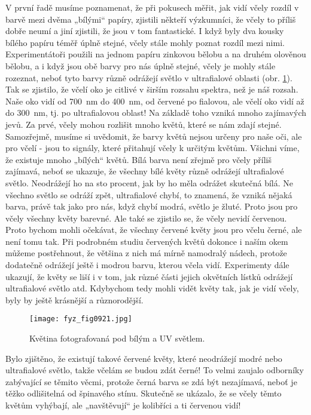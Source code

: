     V první řadě musíme poznamenat, že při pokusech měřit, jak vidí včely rozdíl v barvě mezi dvěma
    „bílými“ papíry, zjistili někteří výzkumníci, že včely to příliš dobře neumí a jiní zjistili, že
    jsou v tom fantastické. I když byly dva kousky bílého papíru téměř úplně stejné, včely stále
    mohly poznat rozdíl mezi nimi. Experimentátoři použili na jednom papíru zinkovou bělobu a na
    druhém olověnou bělobu, a i když jsou obě barvy pro nás úplně stejné, včely je mohly stále
    rozeznat, neboť tyto barvy různě odrážejí světlo v ultrafialové oblasti (obr. \ref{fyz:fig0921}).
    Tak se zjistilo, že včelí oko je citlivé v širším rozsahu spektra, než je náš rozsah. Naše oko
    vidí od \qty{700}{\nm} do \qty{400}{\nm}, od červené po fialovou, ale včelí oko vidí až do
    \qty{300}{\nm}, tj. po ultrafialovou oblast! Na základě toho vzniká mnoho zajímavých jevů. Za
    prvé, včely mohou rozlišit mnoho květů, které se nám zdají stejné. Samozřejmě, musíme si
    uvědomit, že barvy květů nejsou určeny pro naše oči, ale pro včelí - jsou to signály, které
    přitahují včely k určitým květům. Všichni víme, že existuje mnoho „bílých“ květů. Bílá barva
    není zřejmě pro včely příliš zajímavá, neboť se ukazuje, že všechny bílé květy různě odrážejí
    ultrafialové světlo. Neodrážejí ho na sto procent, jak by ho měla odrážet skutečná bílá. Ne
    všechno světlo se odráží zpět, ultrafialové chybí, to znamená, že vzniká nějaká barva, právě tak
    jako pro nás, když chybí modrá, světlo je žluté. Proto jsou pro včely všechny květy barevné. Ale
    také se zjistilo se, že včely nevidí červenou. Proto bychom mohli očekávat, že všechny červené
    květy jsou pro včelu černé, ale není tomu tak. Při podrobném studiu červených květů dokonce i
    naším okem můžeme postřehnout, že většina z nich má mírně namodralý nádech, protože dodatečně
    odrážejí ještě i modrou barvu, kterou včela vidí. Experimenty dále ukazují, že květy se liší i v
    tom, jak různé části jejich okvětních lístků odrážejí ultrafialové světlo atd. Kdybychom tedy
    mohli vidět květy tak, jak je vidí včely, byly by ještě krásnější a různorodější.

    \begin{figure}[ht!] %
      \centering
      \texttt{[image: fyz\_fig0921.jpg]}
      \caption{Květina fotografovaná pod bílým a UV světlem.}
      \label{fyz:fig0921}
    \end{figure}
    
    Bylo zjištěno, že existují takové červené květy, které neodrážejí modré nebo ultrafialové
    světlo, takže včelám se budou zdát černé! To velmi zaujalo odborníky zabývající se těmito věcmi,
    protože černá barva se zdá být nezajímavá, neboť je těžko odlišitelná od špinavého stínu.
    Skutečně se ukázalo, že se včely těmto květům vyhýbají, ale „navštěvují“ je kolibříci a ti
    červenou vidí!

